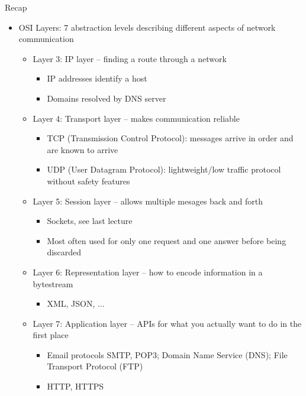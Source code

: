 \begin{frame}{Recap}
%
\begin{itemize}
\item OSI Layers: 7 abstraction levels describing different aspects of network communication
	\begin{itemize}
	\item Layer 3: IP layer -- finding a route through a network
		\begin{itemize}
		\item IP addresses identify a host
		\item Domains resolved by DNS server
		\end{itemize}
\pause
	\item Layer 4: Transport layer -- makes communication reliable
		\begin{itemize}
		\item TCP (Transmission Control Protocol): messages arrive in order and are known to arrive
		\item UDP (User Datagram Protocol): lightweight/low traffic protocol without safety features 
		\end{itemize}
\pause
	\item Layer 5: Session layer -- allows multiple mesages back and forth
		\begin{itemize}
		\item Sockets, see last lecture
		\item Most often used for only one request and one answer before being discarded
		\end{itemize}
\pause
	\item Layer 6: Representation layer -- how to encode information in a bytestream
		\begin{itemize}
		\item XML, JSON, ...
		\end{itemize}
\pause
	\item Layer 7: Application layer -- APIs for what you actually want to do in the first place
		\begin{itemize}
		\item Email protocols SMTP, POP3; Domain Name Service (DNS); File Transport Protocol (FTP)
		\item HTTP, HTTPS
		\end{itemize}
	\end{itemize}
\end{itemize}
%
\end{frame}


